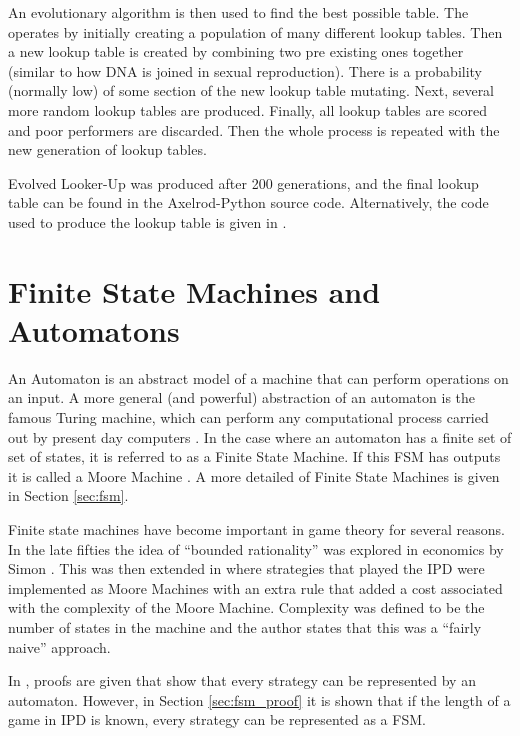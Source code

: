 An evolutionary algorithm is then used to find the best possible table.
The operates by initially creating a population of many different lookup tables.
Then a new lookup table is created by combining two pre existing ones together (similar to how DNA is joined in sexual reproduction).
There is a probability (normally low) of some section of the new lookup table mutating.
Next, several more random lookup tables are produced.
Finally, all lookup tables are scored and poor performers are discarded.
Then the whole process is repeated with the new generation of lookup tables.

Evolved Looker-Up was produced after 200 generations, and the final lookup table can be found in the Axelrod-Python source code.
Alternatively, the code used to produce the lookup table is given in \cite{axelrod-evolver}.

\section{Finite State Machines and Automatons}
An Automaton is an abstract model of a machine that can perform operations on an input.
A more general (and powerful) abstraction of an automaton is the famous Turing machine, which can perform any computational process carried out by present day computers \cite{Turing1936, Kandar2013}.
In the case where an automaton has a finite set of set of states, it is referred to as a Finite State Machine.
If this FSM has outputs it is called a Moore Machine \cite{Ndjountche2016}.
A more detailed of Finite State Machines is given in Section \ref{sec:fsm}.

Finite state machines have become important in game theory for several reasons.
In the late fifties the idea of ``bounded rationality'' was explored in economics by Simon \cite{Simon1972}.
This was then extended in \cite{Rubinstein1986} where strategies that played the IPD were implemented as Moore Machines with an extra rule that added a cost associated with the complexity of the Moore Machine.
Complexity was defined to be the number of states in the machine and the author states that this was a ``fairly naive'' approach.

In \cite{Kalai1986, Kalai1988}, proofs are given that show that every strategy can be represented by an automaton.
However, in Section \ref{sec:fsm_proof} it is shown that if the length of a game in IPD is known, every strategy can be represented as a FSM.

